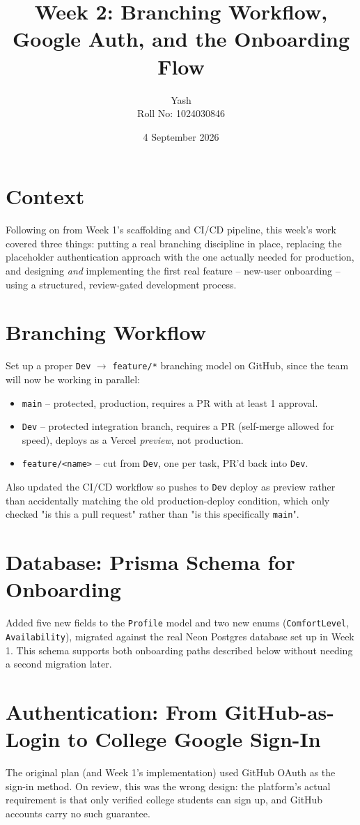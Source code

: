 \documentclass[11pt,a4paper]{article}
\title{\bfseries Week 2: Branching Workflow, Google Auth,
  and the Onboarding Flow}
\author{Yash \\ \small Roll No: 1024030846}
\date{4 September 2026}
\begin{document}
\maketitle

\section{Context}
Following on from Week 1's scaffolding and CI/CD pipeline, this
week's work covered three things: putting a real branching
discipline in place, replacing the placeholder authentication
approach with the one actually needed for production, and
designing \emph{and} implementing the first real feature --
new-user onboarding -- using a structured, review-gated
development process.

\section{Branching Workflow}
Set up a proper \texttt{Dev} $\to$ \texttt{feature/*} branching
model on GitHub, since the team will now be working in parallel:

\begin{itemize}[leftmargin=0.7cm]
  \item \texttt{main} -- protected, production, requires a PR
    with at least 1 approval.
  \item \texttt{Dev} -- protected integration branch, requires a
    PR (self-merge allowed for speed), deploys as a Vercel
    \emph{preview}, not production.
  \item \texttt{feature/<name>} -- cut from \texttt{Dev}, one per
    task, PR'd back into \texttt{Dev}.
\end{itemize}
Also updated the CI/CD workflow so pushes to \texttt{Dev} deploy
as preview rather than accidentally matching the old
production-deploy condition, which only checked "is this a pull
request" rather than "is this specifically \texttt{main}".

\section{Database: Prisma Schema for Onboarding}
Added five new fields to the \texttt{Profile} model and two new
enums (\texttt{ComfortLevel}, \texttt{Availability}), migrated
against the real Neon Postgres database set up in Week 1. This
schema supports both onboarding paths described below without
needing a second migration later.

\section{Authentication: From GitHub-as-Login to College Google
  Sign-In}
The original plan (and Week 1's implementation) used GitHub OAuth
as the sign-in method. On review, this was the wrong design: the
platform's actual requirement is that only verified college
students can sign up, and GitHub accounts carry no such guarantee.
\end{document}
